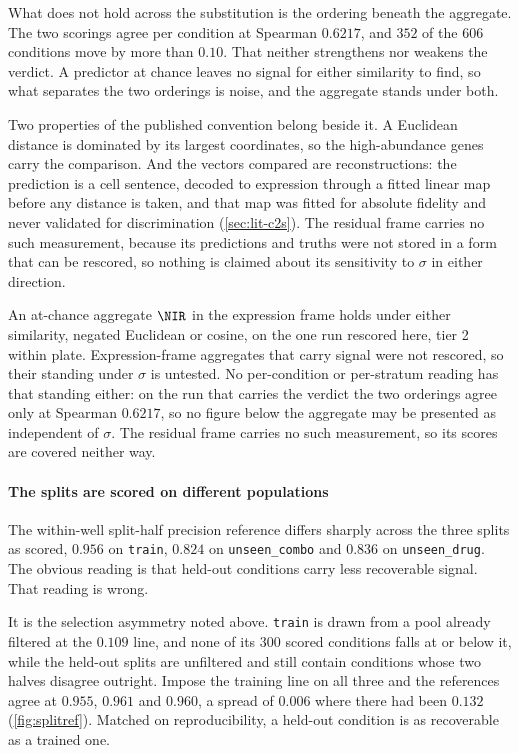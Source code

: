 What does not hold across the substitution is the ordering beneath the
aggregate. The two scorings agree per condition at Spearman $0.6217$, and $352$
of the $606$ conditions move by more than $0.10$. That neither strengthens nor
weakens the verdict. A predictor at chance leaves no signal for either
similarity to find, so what separates the two orderings is noise, and the
aggregate stands under both.

Two properties of the published convention belong beside it. A Euclidean
distance is dominated by its largest coordinates, so the high-abundance genes
carry the comparison. And the vectors compared are reconstructions: the
prediction is a cell sentence, decoded to expression through a fitted linear map
before any distance is taken, and that map was fitted for absolute fidelity and
never validated for discrimination (\cref{sec:lit-c2s}). The residual frame
carries no such measurement, because its predictions and truths were not stored
in a form that can be rescored, so nothing is claimed about its sensitivity to
$\sigma$ in either direction.

\begin{scopelimit}
An at-chance aggregate $\NIR$ in the expression frame holds under either
similarity, negated Euclidean or cosine, on the one run rescored here, tier 2
within plate. Expression-frame aggregates that carry signal were not rescored,
so their standing under $\sigma$ is untested. No per-condition or per-stratum
reading has that standing either: on the run that carries the verdict the two
orderings agree only at Spearman $0.6217$, so no figure below the aggregate may
be presented as independent of $\sigma$. The residual frame carries no such
measurement, so its scores are covered neither way.
\end{scopelimit}

\paragraph{The splits are scored on different populations} The within-well
split-half precision reference differs sharply across the three splits as
scored, $0.956$ on \texttt{train}, $0.824$ on \texttt{unseen\_combo} and $0.836$
on \texttt{unseen\_drug}. The obvious reading is that held-out conditions carry
less recoverable signal. That reading is wrong.

It is the selection asymmetry noted above. \texttt{train} is drawn from a pool
already filtered at the $0.109$ line, and none of its $300$ scored conditions
falls at or below it, while the held-out splits are unfiltered and still contain
conditions whose two halves disagree outright. Impose the training line on all
three and the references agree at $0.955$, $0.961$ and $0.960$, a spread of
$0.006$ where there had been $0.132$ (\cref{fig:splitref}). Matched on
reproducibility, a held-out condition is as recoverable as a trained one.

